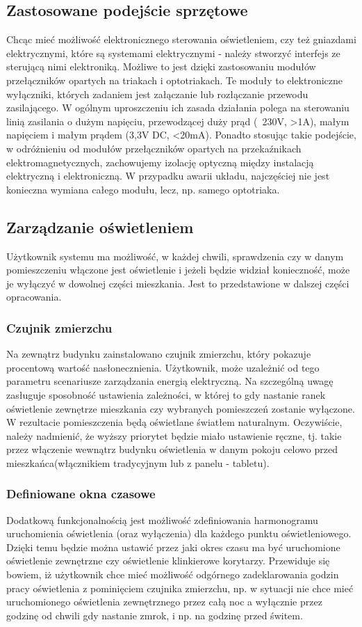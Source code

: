 \documentclass[12pt]{article} %
\begin{document}
\subsection{Zastosowane podejście sprzętowe}
Chcąc mieć możliwość elektronicznego sterowania oświetleniem, czy też gniazdami elektrycznymi, które są systemami elektrycznymi - należy stworzyć interfejs ze sterującą nimi elektroniką. Możliwe to jest dzięki zastosowaniu modułów przełączników opartych na triakach i optotriakach. Te moduły to elektroniczne wyłączniki, których zadaniem jest załączanie lub rozłączanie przewodu zasilającego. W ogólnym uproszczeniu ich zasada działania polega na sterowaniu linią zasilania o dużym napięciu, przewodzącej duży prąd (~230V, >1A), małym napięciem i małym prądem (3,3V DC, <20mA). Ponadto stosując takie podejście, w odróżnieniu od modułów przełączników opartych na przekaźnikach elektromagnetycznych, zachowujemy izolację optyczną między instalacją elektryczną i elektroniczną. W przypadku awarii układu, najczęściej nie jest konieczna wymiana całego modułu, lecz, np. samego optotriaka.

\subsection{Zarządzanie oświetleniem}
Użytkownik systemu ma możliwość, w każdej chwili, sprawdzenia czy w danym pomieszczeniu włączone jest oświetlenie i jeżeli będzie widział konieczność, może je wyłączyć w dowolnej części mieszkania. Jest to przedstawione w dalszej części opracowania.
\subsubsection{Czujnik zmierzchu}
Na zewnątrz budynku zainstalowano czujnik zmierzchu, który pokazuje procentową wartość nasłonecznienia. Użytkownik, może uzależnić od tego parametru scenariusze zarządzania energią elektryczną. Na szczególną uwagę zasługuje sposobność ustawienia zależności, w której to gdy nastanie ranek oświetlenie zewnętrze mieszkania czy wybranych pomieszczeń zostanie wyłączone. W rezultacie pomieszczenia będą oświetlane światłem naturalnym. Oczywiście, należy nadmienić, że wyższy priorytet będzie miało ustawienie ręczne, tj. takie przez włączenie wewnątrz budynku oświetlenia w danym pokoju celowo przed mieszkańca(włącznikiem tradycyjnym lub z panelu - tabletu).

\subsubsection{Definiowane okna czasowe}
Dodatkową funkcjonalnością jest możliwość zdefiniowania harmonogramu uruchomienia oświetlenia (oraz wyłączenia) dla każdego punktu oświetleniowego. Dzięki temu będzie można ustawić przez jaki okres czasu ma być uruchomione oświetlenie zewnętrzne czy oświetlenie klinkierowe korytarzy. Przewiduje się bowiem, iż użytkownik chce mieć możliwość odgórnego zadeklarowania godzin pracy oświetlenia z pominięciem czujnika zmierzchu, np. w sytuacji nie chce mieć uruchomionego oświetlenia zewnętrznego przez całą noc a wyłącznie przez godzinę od chwili gdy nastanie zmrok, i np. na godzinę przed świtem.
\end{document}
